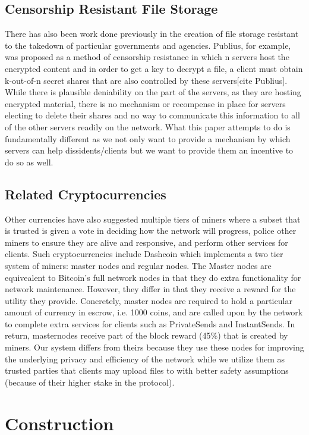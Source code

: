 \documentclass{article}
\begin{document}
\subsection{Censorship Resistant File Storage}
There has also been work done previously in the creation of file storage resistant to the takedown of particular governments and agencies. Publius, for example, was proposed as a method of censorship resistance in which n servers host the encrypted content and in order to get a key to decrypt a file, a client must obtain k-out-of-n secret shares that are also controlled by these servers[cite Publius]. While there is plausible deniability on the part of the servers, as they are hosting encrypted material, there is no mechanism or recompense in place for servers electing to delete their shares and no way to communicate this information to all of the other servers readily on the network. What this paper attempts to do is fundamentally different as we not only want to provide a mechanism by which servers can help dissidents/clients but we want to provide them an incentive to do so as well. 

\subsection{Related Cryptocurrencies}
Other currencies have also suggested multiple tiers of miners where a subset that is trusted is given a vote in deciding how the network will progress, police other miners to ensure they are alive and responsive, and perform other services for clients. Such cryptocurrencies include Dashcoin which implements a two tier system of miners: master nodes and regular nodes. The Master nodes are equivealent to Bitcoin's full network nodes in that they do extra functionality for network maintenance. However, they differ in that they receive a reward for the utility they provide. Concretely, master nodes are required to hold a particular amount of currency in escrow, i.e. 1000 coins, and are called upon by the network to complete extra services for clients such as PrivateSends and InstantSends. In return, masternodes receive part of the block reward (45\%) that is created by miners. Our system differs from theirs because they use these nodes for improving the underlying privacy and efficiency of the network while we utilize them as trusted parties that clients may upload files to with better safety assumptions (because of their higher stake in the protocol).   

\section{Construction}
\end{document}
